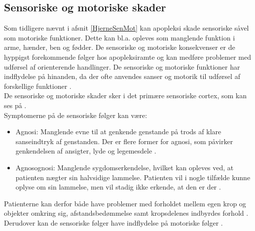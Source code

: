 \subsection{Sensoriske og motoriske skader} %
Som tidligere nævnt i afsnit \ref{HjerneSenMot} kan apopleksi skade sensoriske såvel som motoriske funktioner. Dette kan bl.a. opleves som manglende funktion i arme, hænder, ben og fødder. De sensoriske og motoriske konsekvenser er de hyppigst forekommende følger hos apopleksiramte og kan medføre problemer med udførsel af orienterende handlinger. \cite{Sundhed.dk,DSfA2009}  De sensoriske og motoriske funktioner har indflydelse på hinanden, da der ofte anvendes sanser og motorik til udførsel af forskellige funktioner \cite{Nichols1997}.  \\
De sensoriske og motoriske skader sker i det primære sensoriske cortex, som kan ses på .\\

\noindent Symptomerne på de sensoriske følger kan være:
\begin{itemize}
  \item Agnosi: Manglende evne til at genkende genstande på trods af klare sanseindtryk af genstanden. Der er flere former for agnosi, som påvirker genkendelsen af ansigter, lyde og legemesdele \cite{Redaktionen2015}. 
 \item Agnosognosi: Manglende sygdomserkendelse, hvilket kan opleves ved, at patienten nægter sin halvsidige lammelse. Patienten vil i nogle tilfælde kunne oplyse om sin lammelse, men vil stadig ikke erkende, at den er der \cite{Pedersen1999}.
\end{itemize}
Patienterne kan derfor både have problemer med forholdet mellem egen krop og objekter omkring sig, afstandsbedømmelse samt kropsdelenes indbyrdes forhold \cite{Sundhed.dk,DSfA2009}. Derudover kan de sensoriske følger have indflydelse på motoriske følger \cite{Nichols1997}. \\

